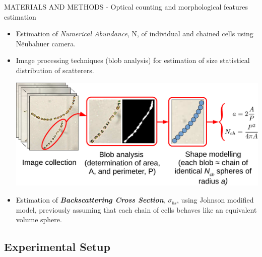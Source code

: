 \documentclass[handout]{beamer}
\newcommand\Fontable{\fontsize{9}{10}\selectfont}
\begin{document}
\begin{frame}{MATERIALS AND METHODS - Optical counting and morphological features estimation}
\Fontable

\begin{itemize}
\item Estimation of \textit{Numerical Abundance}, N, of individual and chained cells using Nëubahuer camera.
\item Image processing techniques (blob analysis) for estimation of size statistical distribution of scatterers.

\vspace{0.3pc}
{\hspace{2pc} \includegraphics[width=0.56\paperwidth]{imagenes/proc_imagenes.pdf}}


\item Estimation of \textbf{\textit{Backscattering Cross Section}}, $\sigma_{bs}$, using Johnson modified model, previously assuming that each chain of cells behaves like an equivalent volume sphere.
\end{itemize}

\end{frame}

\subsection{Experimental Setup}
\end{document}
